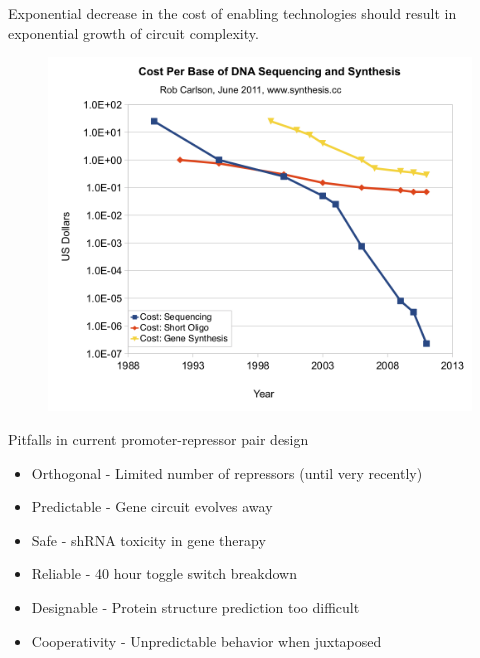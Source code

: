 \documentclass{beamer}
\begin{document}
\begin{frame}
Exponential decrease in the cost of enabling technologies should result 
in exponential growth of circuit complexity.

\begin{figure}
  \centering
  \includegraphics[scale=0.5]{cost_per_base.png}
\end{figure}
\end{frame}

\begin{frame}
\begin{block}{Pitfalls in current promoter-repressor pair design}
  \begin{itemize}
    \item Orthogonal  - Limited number of repressors (until very recently)
    \item Predictable - Gene circuit evolves away
    \item Safe        - shRNA toxicity in gene therapy
    \item Reliable    - 40 hour toggle switch breakdown
    \item Designable  - Protein structure prediction too difficult
    \item Cooperativity - Unpredictable behavior when juxtaposed
  \end{itemize}
\end{block}

\end{frame}

\end{document}
